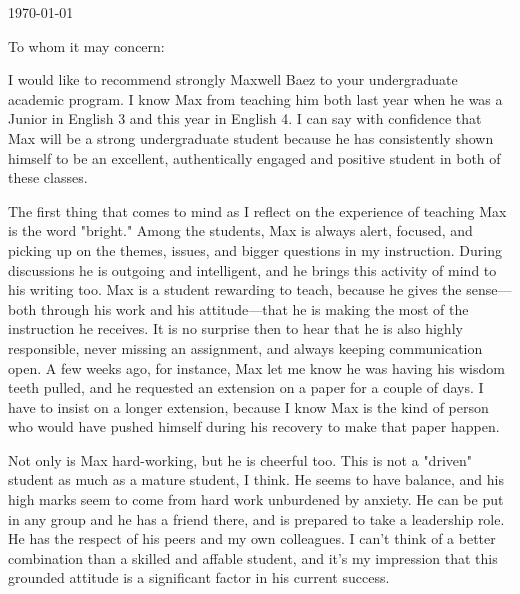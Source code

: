 \documentclass[11pt, letterpaper]{letter} %
\begin{document}

\begin{letter}{
	\today\\	
}


\opening{To whom it may concern:}

I would like to recommend strongly Maxwell Baez to your undergraduate academic program. 
I know Max from teaching him both last year when he was a Junior in English 3 and this year in English 4. 
I can say with confidence that Max will be a strong undergraduate student because he has consistently shown himself to be an excellent, authentically engaged and positive student in both of these classes.

The first thing that comes to mind as I reflect on the experience of teaching Max is the word "bright." 
Among the students, Max is always alert, focused, and picking up on the themes, issues, and bigger questions in my instruction. 
During discussions he is outgoing and intelligent, and he brings this activity of mind to his writing too. 
Max is a student rewarding to teach, because he gives the sense---both through his work and his attitude---that he is making the most of the instruction he receives. 
It is no surprise then to hear that he is also highly responsible, never missing an assignment, and always keeping communication open. 
A few weeks ago, for instance, Max let me know he was having his wisdom teeth pulled, and he requested an extension on a paper for a couple of days. 
I have to insist on a longer extension, because I know Max is the kind of person who would have pushed himself during his recovery to make that paper happen.

Not only is Max hard-working, but he is cheerful too. 
This is not a "driven" student as much as a mature student, I think. 
He seems to have balance, and his high marks seem to come from hard work unburdened by anxiety. 
He can be put in any group and he has a friend there, and is prepared to take a leadership role. 
He has the respect of his peers and my own colleagues. 
I can't think of a better combination than a skilled and affable student, and it's my impression that this grounded attitude is a significant factor in his current success.


\end{letter}
\end{document}

